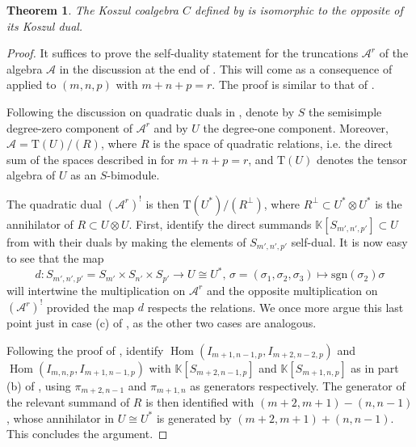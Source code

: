 \documentclass[11pt]{article}
\theoremstyle{plain}
\newtheorem{theorem}[lemma]{Theorem}
\theoremstyle{nonumberplain}
\theoremstyle{plain}
\theoremstyle{nonumberplain}
\newtheorem{proof}{Proof}
\newcommand\bK{{\mathbb K}}
\newcommand\cA{{\mathcal A}}
\DeclareMathOperator{\Hom}{\mathrm{Hom}}
\begin{document}
\begin{theorem}\label{th.self-dual}
  The Koszul coalgebra $C$ defined by  is isomorphic to the opposite of its Koszul dual.  
\end{theorem}
\begin{proof}
  It suffices to prove the self-duality statement for the truncations $\cA^r$ of the algebra $\cA$ in the discussion at the end of . This will come  as a consequence of  applied to $(m,n,p)$ with $m+n+p=r$. The proof is similar to that of \cite[Lemma 6.4]{DPS}.

Following the discussion on quadratic duals in \cite[$\S$2.8]{BGS}, denote by $S$ the semisimple degree-zero component of $\cA^r$ and by $U$ the degree-one component. Moreover, $\cA=\mathrm{T}(U)/(R)$, where
$R$ is the space of quadratic relations, i.e. the direct sum of the spaces described in  for $m+n+p=r$, and $\mathrm{T}(U)$ denotes the tensor algebra of $U$ as an $S$-bimodule. 

The quadratic dual $(\cA^r)^!$ is then $\mathrm{T}(U^*)/(R^\perp)$, where %
$R^\perp\subset U^*\otimes U^*$ is the annihilator of $R\subset U\otimes U$. First, identify the direct summands $\bK[S_{m',n',p'}]\subset U$ from  with their duals by making the elements of $S_{m',n',p'}$ self-dual. It is now easy to see that the map 
\begin{equation}\label{eq.sign}
  d:S_{m',n',p'}=S_{m'}\times S_{n'}\times S_{p'} \to U\cong U^*,\,
 \sigma=(\sigma_1,\sigma_2,\sigma_3) \mapsto \mathrm{sgn}(\sigma_2)\sigma
\end{equation}
will intertwine the multiplication on $\cA^r$ and the opposite multiplication on $(\cA^r)^!$ provided the map $d$ respects the relations. We once more argue this last point just in case (c) of , as the other two cases are analogous. 

Following the proof of , identify $\Hom(I_{m+1,n-1,p},I_{m+2,n-2,p})$ and $\Hom(I_{m,n,p},I_{m+1,n-1,p})$ with $\bK[S_{m+2,n-1,p}]$ and $\bK[S_{m+1,n,p}]$ as in part (b) of , using $\pi_{m+2,n-1}$ and $\pi_{m+1,n}$ as generators respectively. The generator  of the relevant summand of $R$ is then identified with $(m+2,m+1)-(n,n-1)$, whose annihilator in $U\cong U^*$ is generated by $(m+2,m+1)+(n,n-1)$. This concludes the argument. 
\end{proof}
\end{document}
